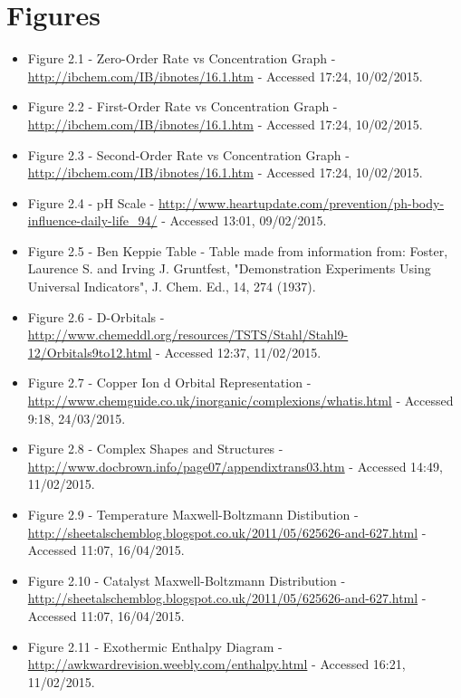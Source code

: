 \section{Figures}
\begin{itemize}

\item Figure 2.1 - Zero-Order Rate vs Concentration Graph - \url{http://ibchem.com/IB/ibnotes/16.1.htm} - Accessed 17:24, 10/02/2015.

\item Figure 2.2 - First-Order Rate vs Concentration Graph  - \url{http://ibchem.com/IB/ibnotes/16.1.htm} - Accessed 17:24, 10/02/2015.

\item Figure 2.3 - Second-Order Rate vs Concentration Graph  - \url{http://ibchem.com/IB/ibnotes/16.1.htm} - Accessed 17:24, 10/02/2015.

\item Figure 2.4 - pH Scale - \url{http://www.heartupdate.com/prevention/ph-body-influence-daily-life_94/} - Accessed 13:01, 09/02/2015. 

\item Figure 2.5 - Ben Keppie Table - Table made from information from: Foster, Laurence S. and Irving J. Gruntfest, "Demonstration Experiments Using Universal Indicators", J. Chem. Ed., 14, 274 (1937).

\item Figure 2.6 - D-Orbitals - \url{http://www.chemeddl.org/resources/TSTS/Stahl/Stahl9-12/Orbitals9to12.html} - Accessed 12:37, 11/02/2015.

\item Figure 2.7 - Copper Ion d Orbital Representation - \url{http://www.chemguide.co.uk/inorganic/complexions/whatis.html} - Accessed 9:18, 24/03/2015.

\item Figure 2.8 - Complex Shapes and Structures - \url{http://www.docbrown.info/page07/appendixtrans03.htm} - Accessed 14:49, 11/02/2015.

\item Figure 2.9 - Temperature Maxwell-Boltzmann Distibution - \url{http://sheetalschemblog.blogspot.co.uk/2011/05/625626-and-627.html} - Accessed 11:07, 16/04/2015.

\item Figure 2.10 - Catalyst Maxwell-Boltzmann Distribution - \url{http://sheetalschemblog.blogspot.co.uk/2011/05/625626-and-627.html} - Accessed 11:07, 16/04/2015.


\item Figure 2.11 - Exothermic Enthalpy Diagram - \url{http://awkwardrevision.weebly.com/enthalpy.html} - Accessed 16:21, 11/02/2015.


\end{itemize}
